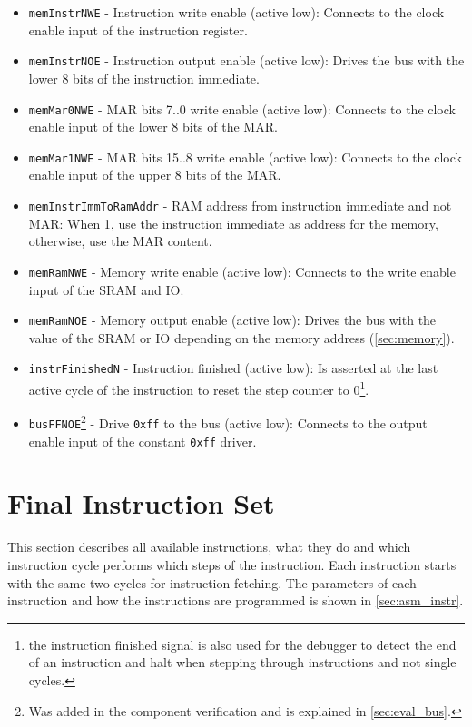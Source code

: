 \begin{itemize}
  \item \texttt{memInstrNWE} - Instruction write enable (active low): Connects to the clock enable input of the instruction register.
  \item \texttt{memInstrNOE} - Instruction output enable (active low): Drives the bus with the lower 8 bits of the instruction immediate.
  \item \texttt{memMar0NWE} - \gls{MAR} bits 7..0 write enable (active low): Connects to the clock enable input of the lower 8 bits of the \gls{MAR}.
  \item \texttt{memMar1NWE} - \gls{MAR} bits 15..8 write enable (active low): Connects to the clock enable input of the upper 8 bits of the \gls{MAR}.
  \item \texttt{memInstrImmToRamAddr} - \gls{RAM} address from instruction immediate and not \gls{MAR}: When 1, use the instruction immediate as address for the memory, otherwise, use the \gls{MAR} content.
  \item \texttt{memRamNWE} - Memory write enable (active low): Connects to the write enable input of the \gls{SRAM} and \gls{IO}.
  \item \texttt{memRamNOE} - Memory output enable (active low): Drives the bus with the value of the \gls{SRAM} or \gls{IO} depending on the memory address (\cref{sec:memory}).
  \item \texttt{instrFinishedN} - Instruction finished (active low): Is asserted at the last active cycle of the instruction to reset the step counter to 0\footnote{the instruction finished signal is also used for the debugger to detect the end of an instruction and halt when stepping through instructions and not single cycles.}.
  \item \texttt{busFFNOE}\footnote{Was added in the component verification and is explained in \cref{sec:eval_bus}.} - Drive \texttt{0xff} to the bus (active low): Connects to the output enable input of the constant \texttt{0xff} driver.
\end{itemize}

\section{Final Instruction Set}\label{sec:instructionSet}
This section describes all available instructions, what they do and which instruction cycle performs which steps of the instruction.
Each instruction starts with the same two cycles for instruction fetching.
The parameters of each instruction and how the instructions are programmed is shown in \cref{sec:asm_instr}.
